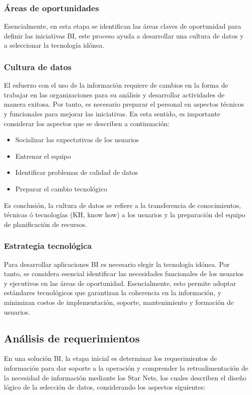 \documentclass[12pt,jou]{apa7}
\begin{document}
\subsubsection{Áreas de oportunidades} 
Esencialmente, en esta etapa se identifican las áreas claves de oportunidad para definir las iniciativas BI, este proceso ayuda a desarrollar una cultura de datos y a seleccionar la tecnología idónea.

\subsubsection{Cultura de datos} 

El esfuerzo con el uso de la información requiere de cambios en la forma de trabajar en las organizaciones para su análisis y desarrollar actividades de manera exitosa. Por tanto, es necesario preparar el personal en aspectos técnicos y funcionales para mejorar las iniciativas. En esta sentido, es importante considerar los aspectos que se describen a continuación:
\begin{itemize}
\item Socializar las expectativas de los usuarios
\item Entrenar el equipo 
\item Identificar problemas de calidad de datos
\item Preparar el cambio tecnológico
\end{itemize}

Es conclusión, la cultura de datos se refiere a la transferencia de conocimientos, técnicas ó tecnologías (KH, know how) a los usuarios y la preparación del equipo de planificación de recursos.


\subsubsection{Estrategia tecnológica} 
Para desarrollar aplicaciones BI es necesario elegir la tecnología idónea. Por tanto, se considera esencial identificar las necesidades funcionales de los usuarios y ejecutivos en las áreas de oportunidad. Esencialmente, esto permite adoptar estándares tecnológicos que garantizan la coherencia en la información, y minimizan costos de implementación, soporte, mantenimiento y formación de usuarios.
	
\subsection{Análisis de requerimientos} 
En una solución BI, la etapa inicial es determinar los requerimientos de información para dar soporte a la operación y comprender la retroalimentación de la necesidad de información mediante los Star Nets, los cuales describen el diseño lógico de la selección de datos, considerando los aspectos siguientes:
\end{document}
